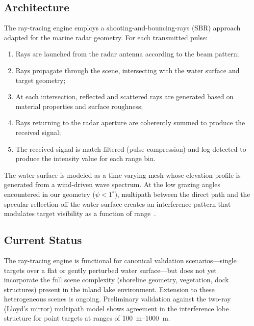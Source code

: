\documentclass[conf]{new-aiaa}
\begin{document}
\subsection{Architecture}

The ray-tracing engine employs a shooting-and-bouncing-rays (SBR) approach~\cite{ling1989shooting} adapted for the marine radar geometry. For each transmitted pulse:
\begin{enumerate}
    \item Rays are launched from the radar antenna according to the beam pattern;
    \item Rays propagate through the scene, intersecting with the water surface and target geometry;
    \item At each intersection, reflected and scattered rays are generated based on material properties and surface roughness;
    \item Rays returning to the radar aperture are coherently summed to produce the received signal;
    \item The received signal is match-filtered (pulse compression) and log-detected to produce the intensity value for each range bin.
\end{enumerate}

The water surface is modeled as a time-varying mesh whose elevation profile is generated from a wind-driven wave spectrum. At the low grazing angles encountered in our geometry ($\psi < 1^{\circ}$), multipath between the direct path and the specular reflection off the water surface creates an interference pattern that modulates target visibility as a function of range~\cite{long2001radar, blake1986radar}.

\subsection{Current Status}

The ray-tracing engine is functional for canonical validation scenarios---single targets over a flat or gently perturbed water surface---but does not yet incorporate the full scene complexity (shoreline geometry, vegetation, dock structures) present in the inland lake environment. Extension to these heterogeneous scenes is ongoing. Preliminary validation against the two-ray (Lloyd's mirror) multipath model shows agreement in the interference lobe structure for point targets at ranges of \SIrange{100}{1000}{\meter}.

\end{document}
